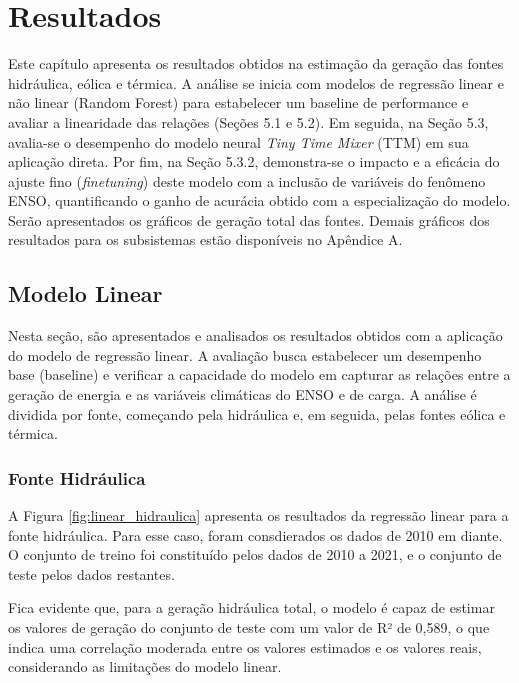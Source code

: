 \chapter{Resultados}
Este capítulo apresenta os resultados obtidos na estimação da geração das fontes hidráulica, eólica e térmica. A análise 
se inicia com modelos de regressão linear e não linear (Random Forest) para estabelecer um baseline de performance e 
avaliar a linearidade das relações (Seções 5.1 e 5.2). Em seguida, na Seção 5.3, avalia-se o desempenho do modelo 
neural \textit{Tiny Time Mixer} (TTM) em sua aplicação direta. Por fim, na Seção 5.3.2, demonstra-se o impacto e a 
eficácia do ajuste fino (\textit{finetuning}) deste modelo com a inclusão de variáveis do fenômeno ENSO, quantificando o ganho de 
acurácia obtido com a especialização do modelo. Serão apresentados os gráficos de geração total das fontes. Demais gráficos 
dos resultados para os subsistemas estão disponíveis no Apêndice A.

\section{Modelo Linear}
Nesta seção, são apresentados e analisados os resultados obtidos com a aplicação do modelo de regressão linear. A avaliação busca 
estabelecer um desempenho base (baseline) e verificar a capacidade do modelo em capturar as relações entre a geração de energia e 
as variáveis climáticas do ENSO e de carga. A análise é dividida por fonte, começando pela hidráulica e, em seguida, pelas fontes 
eólica e térmica.
\subsection{Fonte Hidráulica}
A Figura \ref{fig:linear_hidraulica} apresenta os resultados da regressão linear para a fonte hidráulica. Para esse caso,
foram consdierados os dados de 2010 em diante. O conjunto de treino foi constituído pelos dados de 2010 a 2021, e o 
conjunto de teste pelos dados restantes. 

\begin{figure}[!ht]
  {}
  {}
\end{figure}
Fica evidente que, para a geração hidráulica total, o modelo é capaz de estimar os valores de geração do conjunto de teste
com um valor de R² de 0,589, o que indica uma correlação moderada entre os valores estimados e os valores reais, considerando
as limitações do modelo linear. 

